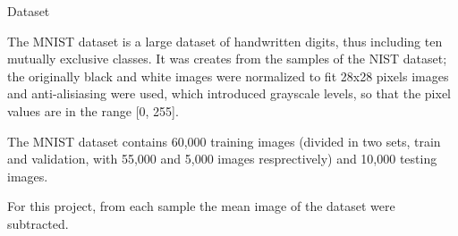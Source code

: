 \begin{tframe}{Dataset}

The MNIST dataset is a large dataset of handwritten digits, thus including ten mutually exclusive classes. It was creates from the samples of the NIST dataset; the originally black and white images were normalized to fit 28x28 pixels images and anti-alisiasing were used, which introduced grayscale levels, so that the pixel values are in the range [0, 255].

\vspace{0.1in}

The MNIST dataset contains 60,000 training images (divided in two sets, train and validation, with 55,000 and 5,000 images resprectively) and 10,000 testing images.

\vspace{0.1in}

For this project, from each sample the mean image of the dataset were subtracted.

\end{tframe}
